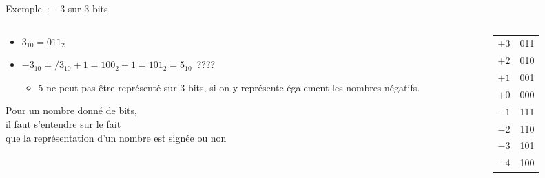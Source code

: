 \begin{frame}{\LARGE Exemple~: $-3$ sur 3 bits}


  \begin{columns}[t]
    \begin{column}{0.62\textwidth}
      \begin{itemize}
        \item $3_{10} = 011_2$
        \item $-3_{10} = /3_{10} + 1 = 100_2 + 1 = 101_2 = 5_{10}$~????
        \begin{itemize}
          \item 5 ne peut pas être représenté sur 3 bits, si on y
            représente également les nombres négatifs.
        \end{itemize}
      \end{itemize}

      \bigskip
      \colorbox{blue!30}{\parbox{0.95\textwidth}{\centering
        Pour un nombre donné de bits,\\
        il faut s'entendre sur le fait\\
        que la représentation d'un nombre est signée ou non}}
    \end{column}
    \begin{column}{0.35\textwidth}
      \small
      \begin{tabular}{cc}
        $+3$ & 011 \\
        $+2$ & 010 \\
        $+1$ & 001 \\
        $+0$ & 000 \\
        $-1$ & 111 \\
        $-2$ & 110 \\
        $-3$ & 101 \\
        $-4$ & 100 \\
      \end{tabular}
    \end{column}
  \end{columns}
\end{frame}

